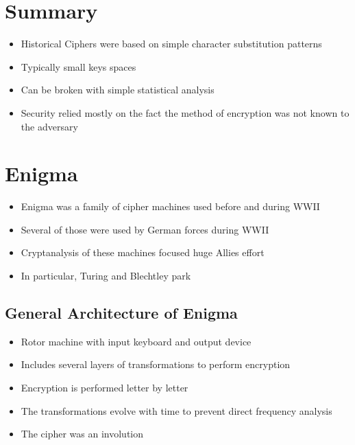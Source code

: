     \section{Summary}
    	\begin{itemize}
    		\item Historical Ciphers were based on simple character substitution patterns
    		\item Typically small keys spaces
    		\item Can be broken with simple statistical analysis
    		\item Security relied mostly on the fact the method of encryption was not known to the adversary
    	\end{itemize}
    
    \section{Enigma}
    	\begin{itemize}
    		\item Enigma was a family of cipher machines used before and during WWII
    		\item Several of those were used by German forces during WWII
    		\item Cryptanalysis of these machines focused huge Allies effort
    		\item In particular, Turing and Blechtley park
    	\end{itemize}
    	
    	\subsection{General Architecture of Enigma}
    		\begin{itemize}
    			\item Rotor machine with input keyboard and output device
    			\item Includes several layers of transformations to perform encryption
    			\item Encryption is performed letter by letter
    			\item The transformations evolve with time to prevent direct frequency analysis
    			\item The cipher was an involution
    		\end{itemize}
    	
